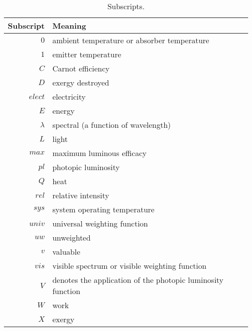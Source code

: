 \begin{table}
\centering
\caption{Subscripts.}
\begin{tabular}{r l}
\toprule
Subscript & Meaning \\
\midrule
$0$ & ambient temperature or absorber temperature \\
$1$ & emitter temperature \\
$C$ & Carnot efficiency \\
$D$ & exergy destroyed \\
$elect$ & electricity \\
$E$ & energy \\
$\lambda$ & spectral (a function of wavelength) \\
$L$ & light \\
$max$ & maximum luminous efficacy \\
$pl$ & photopic luminosity \\
$Q$ & heat \\
$rel$ & relative intensity \\
$sys$ & system operating temperature \\
$univ$ & universal weighting function \\
$uw$ & unweighted \\
$v$ & valuable \\
$vis$ & visible spectrum or visible weighting function \\
$V$ & denotes the application of the photopic luminosity function \\
$W$ & work \\
$X$ & exergy \\
\bottomrule
\end{tabular}
\label{tab:subscripts}
\end{table}


